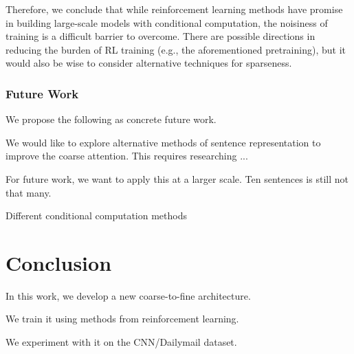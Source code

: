 \documentclass[12pt]{report}
\begin{document}
Therefore, we conclude that while reinforcement learning methods have promise in building large-scale models with conditional computation, the noisiness of training is a difficult barrier to overcome. There are possible directions in reducing the burden of RL training (e.g., the aforementioned pretraining), but it would also be wise to consider alternative techniques for sparseness.


\subsection{Future Work}

We propose the following as concrete future work.

We would like to explore alternative methods of sentence representation to improve the coarse attention. This requires researching ...

For future work, we want to apply this at a larger scale. Ten sentences is still not that many.


Different conditional computation methods

\chapter{Conclusion}
\label{chap:conclusion}

In this work, we develop a new coarse-to-fine architecture.

We train it using methods from reinforcement learning.

We experiment with it on the CNN/Dailymail dataset.



\end{document}
